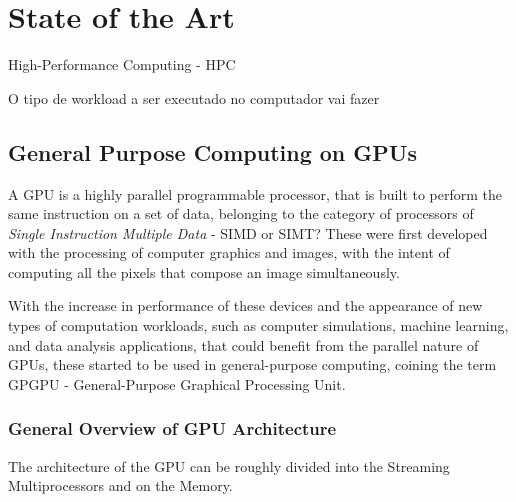 
\chapter{State of the Art}
\label{chapter:stateoftheart}




High-Performance Computing - HPC

O tipo de workload a ser executado no computador vai fazer 


\section{General Purpose Computing on GPUs}
\label{section:gpuarch}

A GPU is a highly parallel programmable processor, that is built to perform the same instruction on a set of data, belonging to the category of processors of \textit{Single Instruction Multiple Data} - SIMD or SIMT?  These were first developed with the processing of computer graphics and images, with the intent of computing all the pixels that compose an image simultaneously. 

With the increase in performance of these devices and the appearance of new types of computation workloads, such as computer simulations, machine learning, and data analysis applications, that could benefit from the parallel nature of GPUs, these started to be used in general-purpose computing, coining the term GPGPU - General-Purpose Graphical Processing Unit.

\subsection{General Overview of GPU Architecture}

The architecture of the GPU can be roughly divided into the Streaming Multiprocessors and on the Memory.  
